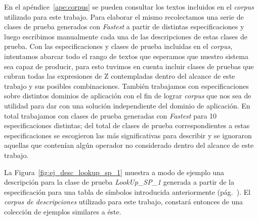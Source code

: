 En el apéndice~\ref{ape:corpus} se pueden consultar los textos incluidos en el \emph{corpus} utilizado para este trabajo. Para elaborar el mismo recolectamos una serie de clases de prueba generados con \emph{Fastest} a partir de distintas especificaciones y luego escribimos manualmente cada una de las descripciones de estas clases de prueba. Con las especificaciones y clases de prueba incluidas en el \emph{corpus}, intentamos abarcar todo el rango de textos que esperamos que nuestro sistema sea capaz de producir, para esto tuvimos en cuenta incluir clases de pruebas que cubran todas las expresiones de Z contempladas dentro del alcance de este trabajo y sus posibles combinaciones. También trabajamos con especificaciones sobre distintos dominios de aplicación con el fin de lograr \emph{corpus} que nos sea de utilidad para dar con una solución independiente del dominio de aplicación. En total trabajamos con clases de prueba generadas con \emph{Fastest} para 10 especificaciones distintas; del total de clases de prueba correspondientes a estas especificaciones se escogieron las más significativas para describir y se ignoraron aquellas que contenían algún operador no considerado dentro del alcance de este trabajo.

La Figura~\ref{fig:ej_desc_lookup_sp_1} muestra a modo de ejemplo una descripción para la clase de prueba \emph{LookUp\_SP\_1} generada a partir de la especificación para una tabla de símbolos introducida anteriormente (pág.~\pageref{fig:spec_symbol_table}). 
El \emph{corpus de descripciones} utilizado para este trabajo, constará entonces de una colección de ejemplos similares a éste.

